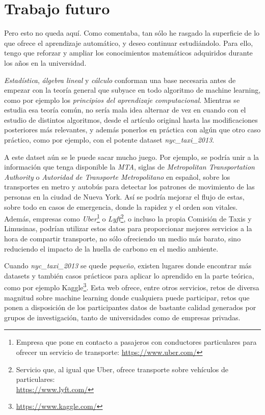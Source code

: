 \section{Trabajo futuro} \label{sec:6.2}

Pero esto no queda aquí. Como comentaba, tan sólo he rasgado la superficie de lo que ofrece el aprendizaje automático, y deseo continuar estudiándolo. Para ello, tengo que reforzar y ampliar los conocimientos matemáticos adquiridos durante los años en la universidad.

\emph{Estadística}, \emph{álgebra lineal} y \emph{cálculo} conforman una base necesaria antes de empezar con la teoría general que subyace en todo algoritmo de machine learning, como por ejemplo los \emph{principios del aprendizaje computacional}. Mientras se estudia esa teoría común, no sería mala idea alternar de vez en cuando con el estudio de distintos algoritmos, desde el artículo original hasta las modificaciones posteriores más relevantes, y además ponerlos en práctica con algún que otro caso práctico, como por ejemplo, con el potente dataset \emph{nyc\_taxi\_2013}.

A este datset aún se le puede sacar mucho juego. Por ejemplo, se podría unir a la información que tenga disponible la \emph{MTA}, siglas de \emph{Metropolitan Transportation Authority} o \emph{Autoridad de Transporte Metropolitano} en español, sobre los transportes en metro y autobús para detectar los patrones de movimiento de las personas en la ciudad de Nueva York. Así se podría mejorar el flujo de estas, sobre todo en casos de emergencia, donde la rapidez y el orden son vitales. Además, empresas como \emph{Uber}\footnote{Empresa que pone en contacto a pasajeros con conductores particulares para ofrecer un servicio de transporte: \url{https://www.uber.com/}} o \emph{Lyft}\footnote{Servicio que, al igual que Uber, ofrece transporte sobre vehículos de particulares: \\ \url{https://www.lyft.com/}}, o incluso la propia Comisión de Taxis y Limusinas, podrían utilizar estos datos para proporcionar mejores servicios a la hora de compartir transporte, no sólo ofreciendo un medio más barato, sino reduciendo el impacto de la huella de carbono en el medio ambiente.

Cuando \emph{nyc\_taxi\_2013} se quede \emph{pequeño}, existen lugares donde encontrar más datasets y también casos prácticos para aplicar lo aprendido en la parte teórica, como por ejemplo Kaggle\footnote{\url{https://www.kaggle.com/}}. Esta web ofrece, entre otros servicios, retos de diversa magnitud sobre machine learning donde cualquiera puede participar, retos que ponen a disposición de los participantes datos de bastante calidad generados por grupos de investigación, tanto de universidades como de empresas privadas.


